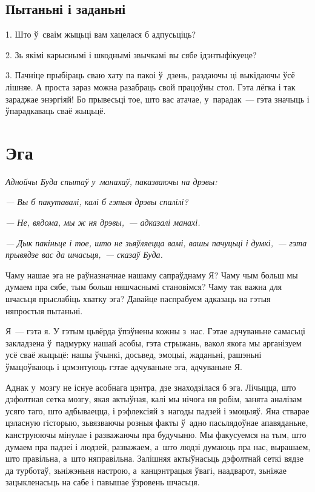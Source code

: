 \subsection*{Пытаньні і заданьні}

1. Што ў~сваім жыцьці вам хацелася б адпусьціць?

2. Зь якімі карыснымі і шкоднымі звычкамі вы сябе ідэнтыфікуеце?

3. Пачніце прыбіраць сваю хату па пакоі ў~дзень, раздаючы ці выкідаючы ўсё лішняе. А проста зараз можна разабраць свой працоўны стол. Гэта лёгка і так зараджае энэргіяй! Бо прывесьці тое, што вас атачае, у~парадак~--- гэта значыць і ўпарадкаваць сваё жыцьцё.


\section{Эга}

\emph{Аднойчы Буда спытаў у~манахаў, паказваючы на дрэвы:} 

\emph{--- Вы б пакутавалі, калі б гэтыя дрэвы спалілі?}

\emph{--- Не, вядома, мы ж ня дрэвы,~--- адказалі манахі.}

\emph{--- Дык пакіньце і тое, што не зьяўляецца вамі, вашы пачуцьці і думкі,~--- гэта прывядзе вас да шчасьця,~--- сказаў Буда.}

Чаму нашае эга не раўназначнае нашаму сапраўднаму Я? Чаму чым больш мы думаем пра сябе, тым больш няшчаснымі становімся? Чаму так важна для шчасьця прыслабіць хватку эга? Давайце паспрабуем адказаць на гэтыя няпростыя пытаньні.

Я~--- гэта я. У гэтым цьвёрда ўпэўнены кожны з~нас. Гэтае адчуваньне самасьці закладзена ў~падмурку нашай асобы, гэта стрыжань, вакол якога мы арганізуем усё сваё жыцьцё: нашы ўчынкі, досьвед, эмоцыі, жаданьні, рашэньні ўмацоўваюць і цэмэнтуюць гэтае адчуваньне эга, адчуваньне Я.


Аднак у~мозгу не існуе асобнага цэнтра, дзе знаходзілася б эга. Лічыцца, што дэфолтная сетка мозгу, якая актыўная, калі мы нічога ня робім, занята аналізам усяго таго, што адбываецца, і рэфлексіяй з~нагоды падзей і эмоцыяў. Яна стварае цэласную гісторыю, зьвязваючы розныя факты ў~адно пасьлядоўнае апавяданьне, канструюючы мінулае і разважаючы пра будучыню. Мы факусуемся на тым, што думаем пра падзеі і людзей, разважаем, а~што людзі думаюць пра нас, вырашаем, што правільна, а~што няправільна. Залішняя актыўнасьць дэфолтнай сеткі вядзе да турботаў, зьніжэньня настрою, а~канцэнтрацыя ўвагі, наадварот, зьніжае зацыкленасьць на сабе і павышае ўзровень шчасьця.


